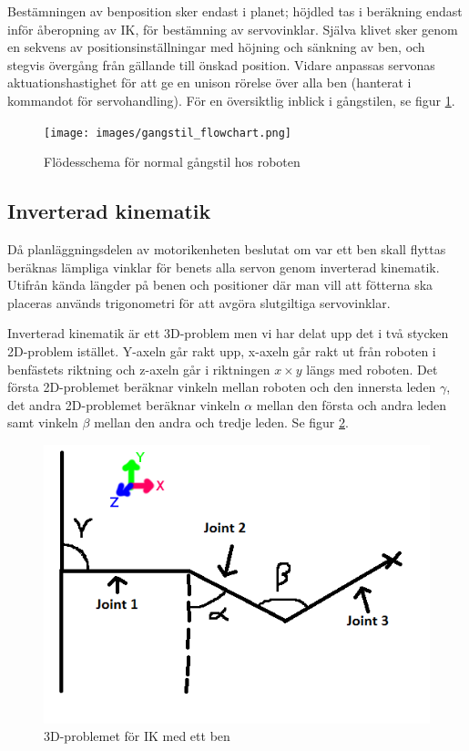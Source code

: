 \documentclass[a4paper,titlepage,12pt]{article}
\begin{document}
	Bestämningen av benposition sker endast i planet; höjdled tas i beräkning endast inför åberopning 
	av IK, för bestämning av servovinklar. Själva klivet sker genom en sekvens av 
	positionsinställningar med höjning och sänkning av ben, och stegvis övergång från gällande till 
	önskad position. Vidare anpassas servonas aktuationshastighet för att ge en unison rörelse 
	över alla ben (hanterat i kommandot för servohandling). För en översiktlig inblick i 
	gångstilen, se figur \ref{fig:walkflow0}.

	\begin{figure}[h]
		\centering
		\texttt{[image: images/gangstil\_flowchart.png]}
		\caption{Flödesschema för normal gångstil hos roboten
        \label{fig:walkflow0}}
	\end{figure}

	\subsection{Inverterad kinematik}
	\label{sub:inverterad-kinematik}
	Då planläggningsdelen av motorikenheten beslutat om var ett ben skall flyttas beräknas 
	lämpliga vinklar för benets alla servon genom inverterad kinematik. Utifrån kända 
	längder på benen och positioner där man vill att fötterna ska placeras används 
	trigonometri för att avgöra slutgiltiga servovinklar.
	
	Inverterad kinematik är ett 3D-problem men vi har delat upp det i två
    stycken 2D-problem istället. Y-axeln går rakt upp, x-axeln går rakt ut från
    roboten i benfästets riktning och z-axeln går i riktningen $x \times y$
    längs med roboten. Det första 2D-problemet beräknar vinkeln mellan roboten
    och den innersta leden $\gamma$, det andra 2D-problemet beräknar vinkeln
    $\alpha$ mellan den första och andra leden samt vinkeln $\beta$ mellan den
    andra och tredje leden. Se figur \ref{fig:ik}.
	
	
	\begin{figure}[h!]
		\centering
		\includegraphics[width=0.5\linewidth]{images/ik.png}
		\caption{3D-problemet för IK med ett ben
		\label{fig:ik}}
	\end{figure}
\end{document}
